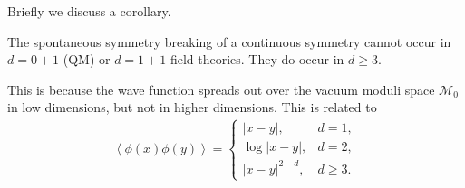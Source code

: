 Briefly we discuss a corollary.

\begin{theorem}
    The spontaneous symmetry breaking of a continuous symmetry cannot occur in $d = 0+1$ (QM) or $d = 1 + 1$ field theories. They do occur in $d \geq 3$.
\end{theorem}

This is because the wave function spreads out over the vacuum moduli space $\mathcal{M}_0$ in low dimensions, but not in higher dimensions. This is related to
\begin{align}
    \left< \phi \left( x \right) \phi \left( y \right)  \right> = \begin{cases}
        \left| x - y \right|, & d = 1, \\
        \log \left| x - y \right|, & d = 2, \\
        \left| x - y \right|^{2-d} , & d \geq 3. 
    \end{cases}
\end{align}

